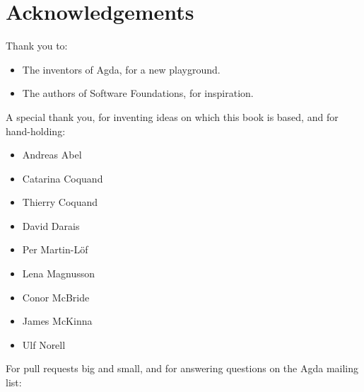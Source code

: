 \chapter{Acknowledgements}
Thank you to:

\begin{itemize}
\tightlist
\item
  The inventors of Agda, for a new playground.
\item
  The authors of Software Foundations, for inspiration.
\end{itemize}

A special thank you, for inventing ideas on which this book is based,
and for hand-holding:

\begin{itemize}
\tightlist
\item
  Andreas Abel
\item
  Catarina Coquand
\item
  Thierry Coquand
\item
  David Darais
\item
  Per Martin-Löf
\item
  Lena Magnusson
\item
  Conor McBride
\item
  James McKinna
\item
  Ulf Norell
\end{itemize}

For pull requests big and small, and for answering questions on the Agda
mailing list:

